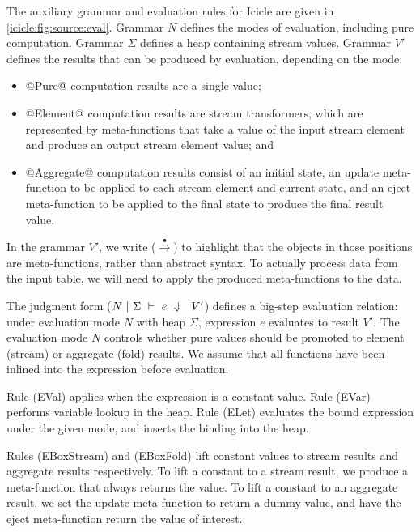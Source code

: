 The auxiliary grammar and evaluation rules for Icicle are given in \cref{icicle:fig:source:eval}.
Grammar $N$ defines the modes of evaluation, including pure computation.
Grammar $\Sigma$ defines a heap containing stream values.
Grammar $V'$ defines the results that can be produced by evaluation, depending on the mode:
\begin{itemize}
\item
@Pure@ computation results are a single value;
\item
@Element@ computation results are stream transformers, which are represented by meta-functions that take a value of the input stream element and produce an output stream element value; and
\item
@Aggregate@ computation results consist of an initial state, an update meta-function to be applied to each stream element and current state, and an eject meta-function to be applied to the final state to produce the final result value.
\end{itemize}



In the grammar $V'$, we write ($\stackrel{\bullet}{\to}$) to highlight that the objects in those positions are meta-functions, rather than abstract syntax.
To actually process data from the input table, we will need to apply the produced meta-functions to the data.

The judgment form ($N~|~\Sigma~\vdash~e~\Downarrow~~V'$) defines a big-step evaluation relation: under evaluation mode $N$ with heap $\Sigma$, expression $e$ evaluates to result $V'$.
The evaluation mode $N$ controls whether pure values should be promoted to element (stream) or aggregate (fold) results. 
We assume that all functions have been inlined into the expression before evaluation.

Rule (EVal) applies when the expression is a constant value.
Rule (EVar) performs variable lookup in the heap.
Rule (ELet) evaluates the bound expression under the given mode, and inserts the binding into the heap.



Rules (EBoxStream) and (EBoxFold) lift constant values to stream results and aggregate results respectively.
To lift a constant to a stream result, we produce a meta-function that always returns the value.
To lift a constant to an aggregate result, we set the update meta-function to return a dummy value, and have the eject meta-function return the value of interest.

